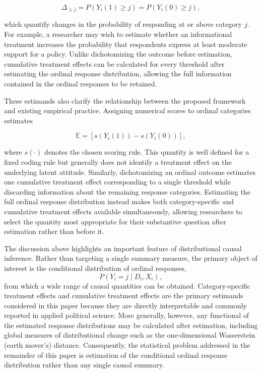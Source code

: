 \documentclass{article}
\begin{document}
\[
\Delta_{\ge j} = P\left( Y_i(1)\ge j \right) = P\left( Y_i(0)\ge j \right),
\]

which quantify changes in the probability of responding at or above category $j$. For example, a researcher may wish to estimate whether an informational treatment increases the probability that respondents express at least moderate support for a policy. Unlike dichotomizing the outcome before estimation, cumulative treatment effects can be calculated for every threshold after estimating the ordinal response distribution, allowing the full information contained in the ordinal responses to be retained.

These estimands also clarify the relationship between the proposed framework and existing empirical practice. Assigning numerical scores to ordinal categories estimates

\[
\mathbb{E} = \left[ s(Y_i(1))-s(Y_i(0)) \right],
\]

where $s(\cdot)$ denotes the chosen scoring rule. This quantity is well defined for a fixed coding rule but generally does not identify a treatment effect on the underlying latent attitude. Similarly, dichotomizing an ordinal outcome estimates one cumulative treatment effect corresponding to a single threshold while discarding information about the remaining response categories. Estimating the full ordinal response distribution instead makes both category-specific and cumulative treatment effects available simultaneously, allowing researchers to select the quantity most appropriate for their substantive question after estimation rather than before it.

The discussion above highlights an important feature of distributional causal inference. Rather than targeting a single summary measure, the primary object of interest is the conditional distribution of ordinal responses,
\[
P(Y_i=j\mid D_i,X_i),
\]
from which a wide range of causal quantities can be obtained. Category-specific treatment effects and cumulative treatment effects are the primary estimands considered in this paper because they are directly interpretable and commonly reported in applied political science. More generally, however, any functional of the estimated response distributions may be calculated after estimation, including global measures of distributional change such as the one-dimensional Wasserstein (earth mover's) distance. Consequently, the statistical problem addressed in the remainder of this paper is estimation of the conditional ordinal response distribution rather than any single causal summary.
\end{document}
